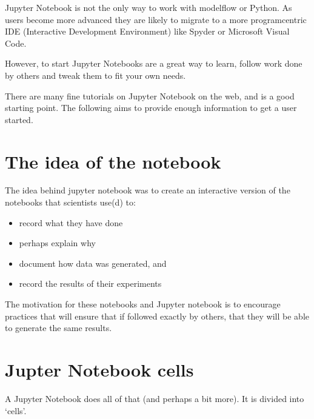 \documentclass[letterpaper,10pt,english]{jupyterBook}
\begin{document}
\sphinxAtStartPar
Jupyter Notebook is not the only way to work with modelflow or Python.  As users become more advanced they are likely to migrate to a more program\sphinxhyphen{}centric IDE (Interactive Development Environment) like Spyder or Microsoft Visual Code.

\sphinxAtStartPar
However, to start Jupyter Notebooks are a great way to learn, follow work done by others and tweak them to fit your own needs.

\sphinxAtStartPar
There are many fine tutorials on Jupyter Notebook on the web, and  is a good starting point. The following aims to provide enough information to get a user started.


\section{The idea of the notebook}
\label{\detokenize{content/04_PythonEssentials/Intro_Jupyter_notebook:the-idea-of-the-notebook}}
\sphinxAtStartPar
The idea behind jupyter notebook was to create an interactive version of the notebooks that scientists use(d) to:
\begin{itemize}
\item {} 
\sphinxAtStartPar
record what they have done

\item {} 
\sphinxAtStartPar
perhaps explain why

\item {} 
\sphinxAtStartPar
document how data was generated, and

\item {} 
\sphinxAtStartPar
record the results of their experiments

\end{itemize}

\sphinxAtStartPar
The motivation for these notebooks and Jupyter notebook is to encourage practices that will ensure that if followed exactly by others, that they will be able to generate the same results.


\section{Jupter Notebook cells}
\label{\detokenize{content/04_PythonEssentials/Intro_Jupyter_notebook:jupter-notebook-cells}}
\sphinxAtStartPar
A Jupyter Notebook  does all of that (and perhaps a bit more).  It is divided into ‘cells’.
\end{document}
